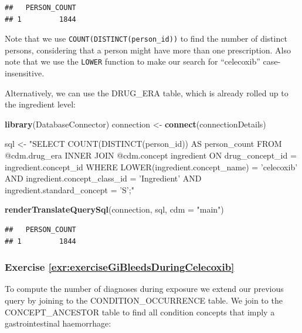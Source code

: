 \documentclass[11pt]{book}
\newenvironment{Shaded}{\begin{snugshade}}{\end{snugshade}}
\newcommand{\DataTypeTok}[1]{\textcolor[rgb]{0.13,0.29,0.53}{#1}}
\newcommand{\KeywordTok}[1]{\textcolor[rgb]{0.13,0.29,0.53}{\textbf{#1}}}
\newcommand{\NormalTok}[1]{#1}
\newcommand{\StringTok}[1]{\textcolor[rgb]{0.31,0.60,0.02}{#1}}
\theoremstyle{definition}
\theoremstyle{definition}
\theoremstyle{definition}
\theoremstyle{remark}
\begin{document}
\begin{verbatim}
##   PERSON_COUNT
## 1         1844
\end{verbatim}

Note that we use \texttt{COUNT(DISTINCT(person\_id))} to find the number of distinct persons, considering that a person might have more than one prescription. Also note that we use the \texttt{LOWER} function to make our search for ``celecoxib'' case-insensitive.

Alternatively, we can use the DRUG\_ERA table, which is already rolled up to the ingredient level:

\begin{Shaded}
\begin{Highlighting}[]
\KeywordTok{library}\NormalTok{(DatabaseConnector)}
\NormalTok{connection <-}\StringTok{ }\KeywordTok{connect}\NormalTok{(connectionDetails)}

\NormalTok{sql <-}\StringTok{ "SELECT COUNT(DISTINCT(person_id)) AS person_count}
\StringTok{FROM @cdm.drug_era}
\StringTok{INNER JOIN @cdm.concept ingredient}
\StringTok{  ON drug_concept_id = ingredient.concept_id}
\StringTok{WHERE LOWER(ingredient.concept_name) = 'celecoxib'}
\StringTok{  AND ingredient.concept_class_id = 'Ingredient'}
\StringTok{  AND ingredient.standard_concept = 'S';"}

\KeywordTok{renderTranslateQuerySql}\NormalTok{(connection, sql, }\DataTypeTok{cdm =} \StringTok{"main"}\NormalTok{)}
\end{Highlighting}
\end{Shaded}

\begin{verbatim}
##   PERSON_COUNT
## 1         1844
\end{verbatim}

\hypertarget{exercise-refexrexercisegibleedsduringcelecoxib}{%
\subsubsection*{Exercise \ref{exr:exerciseGiBleedsDuringCelecoxib}}\label{exercise-refexrexercisegibleedsduringcelecoxib}}

To compute the number of diagnoses during exposure we extend our previous query by joining to the CONDITION\_OCCURRENCE table. We join to the CONCEPT\_ANCESTOR table to find all condition concepts that imply a gastrointestinal haemorrhage:
\end{document}
